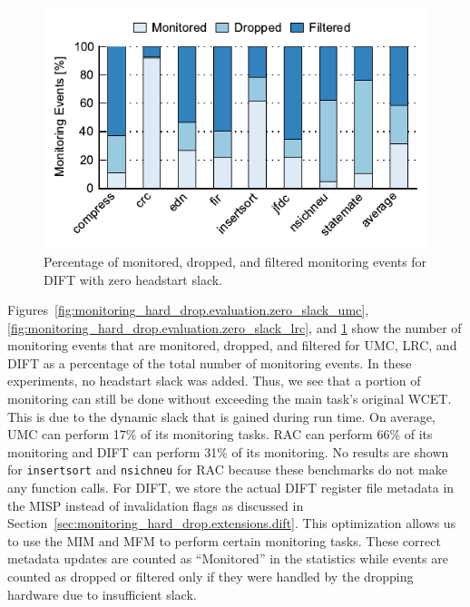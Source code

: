 \begin{figure}
  \begin{center}
    \includegraphics{monitoring_hard_drop/data/zero_slack_dift.pdf}
    \caption{Percentage of monitored, dropped, and filtered monitoring events
    for DIFT with zero headstart slack.}
    \label{fig:monitoring_hard_drop.evaluation.zero_slack_dift}
  \end{center}
\end{figure}

Figures~\ref{fig:monitoring_hard_drop.evaluation.zero_slack_umc},
\ref{fig:monitoring_hard_drop.evaluation.zero_slack_lrc}, and
\ref{fig:monitoring_hard_drop.evaluation.zero_slack_dift} show the number of
monitoring events that are monitored, dropped, and filtered for UMC, LRC, and
DIFT as a percentage of the total number of monitoring events. In these
experiments, no headstart slack was added. Thus, we see that a portion of
monitoring can
still be done without exceeding the main task's original WCET. This is due to the
dynamic slack that is gained during run time. On average, UMC can perform 17\%
of its monitoring tasks. RAC can perform 66\% of its monitoring and DIFT can
perform 31\% of its monitoring.  No results are shown for {\tt insertsort} and
{\tt nsichneu} for RAC because these benchmarks do not make any function calls.
For DIFT, we store the actual DIFT register file metadata in the MISP instead
of invalidation flags as discussed in
Section~\ref{sec:monitoring_hard_drop.extensions.dift}. This optimization
allows us to use the MIM and MFM to
perform certain monitoring tasks. These correct metadata updates are counted as
``Monitored'' in the statistics while events are counted as dropped or filtered
only if they were handled by the dropping hardware due to insufficient slack.

